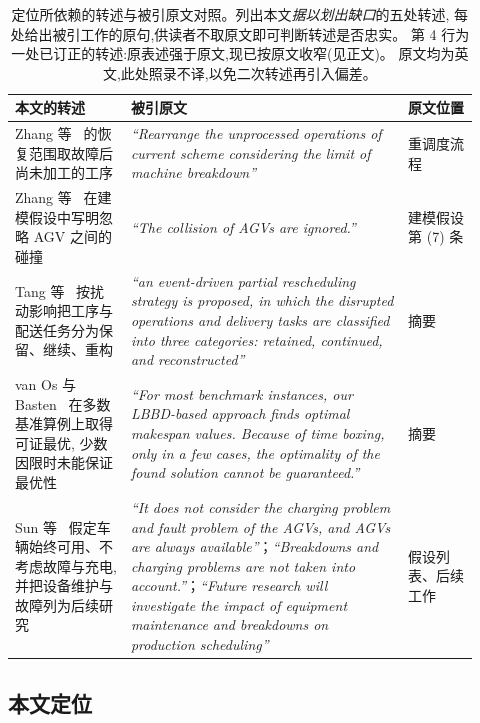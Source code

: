 \documentclass[manuscript,screen,review]{acmart}
\begin{document}
\begin{table}[t]
\centering
\caption{定位所依赖的转述与被引原文对照。列出本文\emph{据以划出缺口}的五处转述,
每处给出被引工作的原句,供读者不取原文即可判断转述是否忠实。
第 4 行为一处已订正的转述:原表述强于原文,现已按原文收窄(见正文)。
原文均为英文,此处照录不译,以免二次转述再引入偏差。}
\label{tab:refcheck}
\footnotesize
\begin{tabular}{@{}p{0.23\linewidth}p{0.55\linewidth}p{0.14\linewidth}@{}}
\toprule
\textbf{本文的转述} & \textbf{被引原文} & \textbf{原文位置} \\
\midrule
Zhang 等~\cite{zhang2023energy} 的恢复范围取故障后尚未加工的工序 &
\emph{``Rearrange the unprocessed operations of current scheme considering the limit of
machine breakdown''} &
重调度流程 \\
\addlinespace
Zhang 等~\cite{zhang2023energy} 在建模假设中写明忽略 AGV 之间的碰撞 &
\emph{``The collision of AGVs are ignored.''} &
建模假设第 (7) 条 \\
\addlinespace
Tang 等~\cite{tang2026dynamic} 按扰动影响把工序与配送任务分为保留、继续、重构 &
\emph{``an event-driven partial rescheduling strategy is proposed, in which the disrupted
operations and delivery tasks are classified into three categories: retained, continued,
and reconstructed''} &
摘要 \\
\addlinespace
van Os 与 Basten~\cite{vanos2026exact} 在多数基准算例上取得可证最优,
少数因限时未能保证最优性 &
\emph{``For most benchmark instances, our LBBD-based approach finds optimal makespan
values. Because of time boxing, only in a few cases, the optimality of the found solution
cannot be guaranteed.''} &
摘要 \\
\addlinespace
Sun 等~\cite{sun2023integrated} 假定车辆始终可用、不考虑故障与充电,
并把设备维护与故障列为后续研究 &
\emph{``It does not consider the charging problem and fault problem of the AGVs, and AGVs
are always available''}；\emph{``Breakdowns and charging problems are not taken into
account.''}；\emph{``Future research will investigate the impact of equipment maintenance
and breakdowns on production scheduling''} &
假设列表、后续工作 \\
\bottomrule
\end{tabular}
\end{table}

\subsection{本文定位}
\label{sec:rw_claim}
\end{document}
